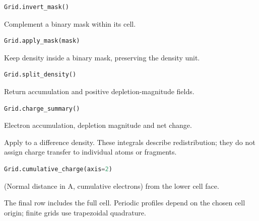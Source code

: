 \begin{samepage}

\begin{lstlisting}[language=Python]
Grid.invert_mask()
\end{lstlisting}

Complement a binary mask within its cell.

\end{samepage}



\begin{samepage}

\begin{lstlisting}[language=Python]
Grid.apply_mask(mask)
\end{lstlisting}

Keep density inside a binary mask, preserving the density unit.

\end{samepage}



\begin{samepage}

\begin{lstlisting}[language=Python]
Grid.split_density()
\end{lstlisting}

Return accumulation and positive depletion-magnitude fields.

\end{samepage}



\begin{samepage}

\begin{lstlisting}[language=Python]
Grid.charge_summary()
\end{lstlisting}

Electron accumulation, depletion magnitude and net change.

Apply to a difference density. These integrals describe redistribution;
they do not assign charge transfer to individual atoms or fragments.

\end{samepage}



\begin{samepage}

\begin{lstlisting}[language=Python]
Grid.cumulative_charge(axis=2)
\end{lstlisting}

(Normal distance in A, cumulative electrons) from the lower cell face.

The final row includes the full cell. Periodic profiles depend on the
chosen cell origin; finite grids use trapezoidal quadrature.

\end{samepage}



